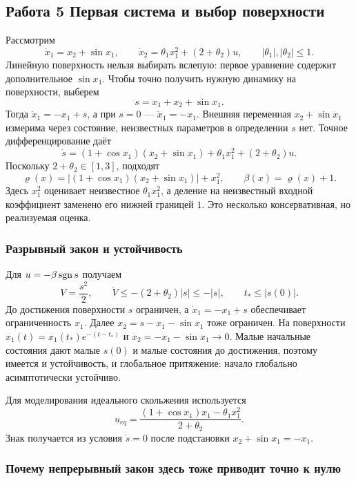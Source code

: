 \subsection{Работа 5 Первая система и выбор поверхности}
\label{subsec:sm-lab1}
\addition Рассмотрим
\[
 \dot x_1=x_2+\sin x_1,\qquad
 \dot x_2=\theta_1x_1^2+(2+\theta_2)u,\qquad |\theta_1|,|\theta_2|\le1.
\]
Линейную поверхность нельзя выбирать вслепую: первое уравнение содержит
дополнительное $\sin x_1$. Чтобы точно получить нужную динамику на
поверхности, выберем
\[
 s=x_1+x_2+\sin x_1.
\]
Тогда $\dot x_1=-x_1+s$, а при $s=0$ --- $\dot x_1=-x_1$.
Внешняя переменная $x_2+\sin x_1$ измерима через состояние, неизвестных
параметров в определении $s$ нет. Точное дифференцирование даёт
\[
 \dot s=(1+\cos x_1)(x_2+\sin x_1)+\theta_1x_1^2+(2+\theta_2)u.
\]
Поскольку $2+\theta_2\in[1,3]$, подходят
\begin{equation}
 \varrho(x)=|(1+\cos x_1)(x_2+\sin x_1)|+x_1^2,\qquad
 \beta(x)=\varrho(x)+1.
 \label{eq:sm-lab1-gain}
\end{equation}
Здесь $x_1^2$ оценивает неизвестное $\theta_1x_1^2$, а деление на
неизвестный входной коэффициент заменено его нижней границей $1$.
Это несколько консервативная, но реализуемая оценка.

\subsubsection{Разрывный закон и устойчивость}

Для $u=-\beta\operatorname{sgn} s$ получаем
\[
 V=\frac{s^2}{2},\qquad
 \dot V\le-(2+\theta_2)|s|\le-|s|,\qquad t_*\le|s(0)|.
\]
До достижения поверхности $s$ ограничен, а $\dot x_1=-x_1+s$ обеспечивает
ограниченность $x_1$. Далее $x_2=s-x_1-\sin x_1$ тоже ограничен.
На поверхности $x_1(t)=x_1(t_*)e^{-(t-t_*)}$ и
$x_2=-x_1-\sin x_1\to0$. Малые начальные состояния дают малые $s(0)$
и малые состояния до достижения, поэтому имеется и устойчивость, и
глобальное притяжение: начало глобально асимптотически устойчиво.

Для моделирования идеального скольжения используется
\[
 u_{eq}=\frac{(1+\cos x_1)x_1-\theta_1x_1^2}{2+\theta_2}.
\]
Знак получается из условия $\dot s=0$ после подстановки
$x_2+\sin x_1=-x_1$.

\subsubsection{Почему непрерывный закон здесь тоже приводит точно к нулю}

